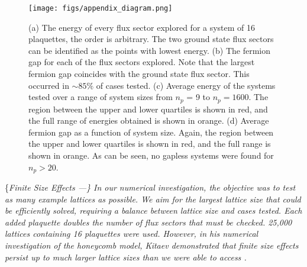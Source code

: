 \begin{figure}[t]
    \centering
    \texttt{[image: figs/appendix\_diagram.png]}
    \caption{(a) The energy of every flux sector explored for a system of 16 plaquettes, the order is arbitrary. The two ground state flux sectors can be identified as the points with lowest energy. (b) The fermion gap for each of the flux sectors explored. Note that the largest fermion gap coincides with the ground state flux sector. This occurred in $\sim 85\%$ of cases tested. (c) Average energy of the systems tested over a range of system sizes from $n_p$ = 9 to $n_p = 1600$. The region between the upper and lower quartiles is shown in red, and the full range of energies obtained is shown in orange. (d) Average fermion gap as a function of system size. Again, the region between the upper and lower quartiles is shown in red, and the full range is shown in orange. As can be seen, no gapless systems were found for $n_p > 20$. }
    \label{fig:energy_gaps_example}
\end{figure}

\{\it Finite Size Effects ---\} In our numerical investigation, the
objective was to test as many example lattices as possible. We aim for
the largest lattice size that could be efficiently solved, requiring a
balance between lattice size and cases tested. Each added plaquette
doubles the number of flux sectors that must be checked. 25,000 lattices
containing 16 plaquettes were used. However, in his numerical
investigation of the honeycomb model, Kitaev demonstrated that finite
size effects persist up to much larger lattice sizes than we were able
to access \cite{kitaevAnyonsExactlySolved2006}.

\par

